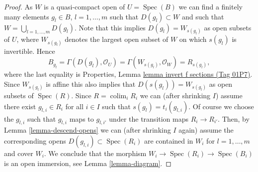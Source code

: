\documentclass{amsart}
\theoremstyle{plain}
\theoremstyle{definition}
\theoremstyle{remark}
\numberwithin{equation}{subsection}
\def\colim{\mathop{\mathrm{colim}}\nolimits}
\def\Spec{\mathop{\mathrm{Spec}}}
\begin{document}
\begin{proof}
\medskip\noindent
As $W$ is a quasi-compact open of $U = \Spec(B)$
we can find a finitely many elements $g_l \in B$, $l = 1, \ldots, m$
such that $D(g_l) \subset W$ and such that
$W = \bigcup_{l = 1, \ldots, m} D(g_l)$.
Note that this implies $D(g_l) = W_{s(g_l)}$ as open subsets of $U$,
where $W_{s(g_l)}$ denotes the largest open subset of $W$ on which
$s(g_l)$ is invertible. Hence
$$
B_{g_l} =
\Gamma(D(g_l), \mathcal{O}_U) =
\Gamma(W_{s(g_l)}, \mathcal{O}_W) = R_{s(g_l)},
$$
where the last equality is
Properties, Lemma \href{https://stacks.math.columbia.edu/tag/01P7}{lemma invert f sections (Tag 01P7)}.
Since $W_{s(g_l)}$ is affine this also
implies that $D(s(g_l)) = W_{s(g_l)}$ as open subsets of $\Spec(R)$.
Since $R = \colim_i R_i$ we can (after shrinking $I$)
assume there exist $g_{l, i} \in R_i$ for all $i \in I$ such that
$s(g_l) = t_i(g_{l, i})$. Of course we choose the $g_{l, i}$
such that $g_{l, i}$ maps to $g_{l, i'}$ under the transition maps
$R_i \to R_{i'}$. Then, by Lemma \ref{lemma-descend-opens} we can
(after shrinking $I$ again)
assume the corresponding opens $D(g_{l, i}) \subset \Spec(R_i)$
are contained in $W_i$ for $l = 1, \ldots, m$ and cover $W_i$.
We conclude that the morphism $W_i \to \Spec(R_i) \to \Spec(B_i)$
is an open immersion, see Lemma \ref{lemma-diagram}.


\end{proof}
\end{document}
